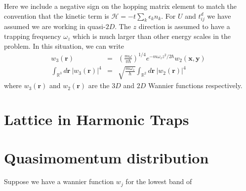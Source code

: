 \documentclass{article}
\theoremstyle{definition}
\begin{document}
Here we include a negative sign on the hopping matrix element to match the convention that the kinetic term is $\mathcal{H} = -t \sum_k \epsilon_k n_k$. For $U$ and $t^d_{ij}$ we have assumed we are working in quasi-$2D$. The $z$ direction is assumed to have a trapping frequency $\omega_z$ which is much larger than other energy scales in the problem. In this situation, we can write
\begin{eqnarray}
w_3(\mathbf{r}) &=& \left(\frac{m\omega}{\pi\hbar} \right)^{1/4}e^{-m\omega_z z^2 /2\hbar} w_2(\mathbf{x}, \mathbf{y})\\
\int_{\mathbb{R}^3} d\mathbf{r} \ \left| w_3(\mathbf{r}) \right|^4 &=&  \sqrt{\frac{m\omega_z}{h}} \int_{\mathbb{R}^2} d\mathbf{r} \ \left| w_2(\mathbf{r}) \right|^4
\end{eqnarray}
where $w_3(\mathbf{r})$ and $w_2(\mathbf{r})$ are the $3D$ and $2D$ Wannier functions respectively.

\section{Lattice in Harmonic Traps}


\section{Quasimomentum distribution}

Suppose we have a wannier function $w_j$ for the lowest band of
\end{document}
